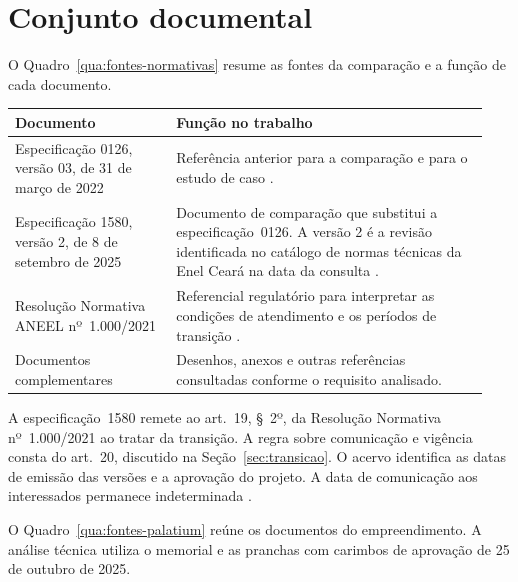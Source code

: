\section{Conjunto documental}
\label{sec:documentos}

O Quadro~\ref{qua:fontes-normativas} resume as fontes da comparação e a função de cada documento.

\par\noindent
\begin{minipage}{\linewidth}
  \label{qua:fontes-normativas}
  \vspace{0.7\baselineskip}
  \centering
  {\small
  \renewcommand{\arraystretch}{1.2}
  \begin{tabular}{|>{\raggedright\arraybackslash}p{0.32\linewidth}|>{\raggedright\arraybackslash}p{0.62\linewidth}|}
    \hline
    \textbf{Documento} & \textbf{Função no trabalho} \\\hline
    Especificação 0126, versão 03, de 31 de março de 2022 & Referência anterior para a comparação e para o estudo de caso \cite{enel0126}. \\\hline
    Especificação 1580, versão 2, de 8 de setembro de 2025 & Documento de comparação que substitui a especificação~0126. A versão 2 é a revisão identificada no catálogo de normas técnicas da Enel Ceará na data da consulta \cite[item~2, p.~3--4]{enel1580}\cite{enelnormasce}. \\\hline
    Resolução Normativa ANEEL nº~1.000/2021 & Referencial regulatório para interpretar as condições de atendimento e os períodos de transição \cite{aneel1000}. \\\hline
    Documentos complementares & Desenhos, anexos e outras referências consultadas conforme o requisito analisado. \\\hline
  \end{tabular}
  }
\end{minipage}
\par

A especificação~1580 remete ao art.~19, §~2º, da Resolução Normativa nº~1.000/2021 ao tratar da transição. A regra sobre comunicação e vigência consta do art.~20, discutido na Seção~\ref{sec:transicao}. O acervo identifica as datas de emissão das versões e a aprovação do projeto. A data de comunicação aos interessados permanece indeterminada \cite[item~2]{enel1580}\cite[art.~20]{aneel1000}.

O Quadro~\ref{qua:fontes-palatium} reúne os documentos do empreendimento. A análise técnica utiliza o memorial e as pranchas com carimbos de aprovação de 25 de outubro de 2025.

